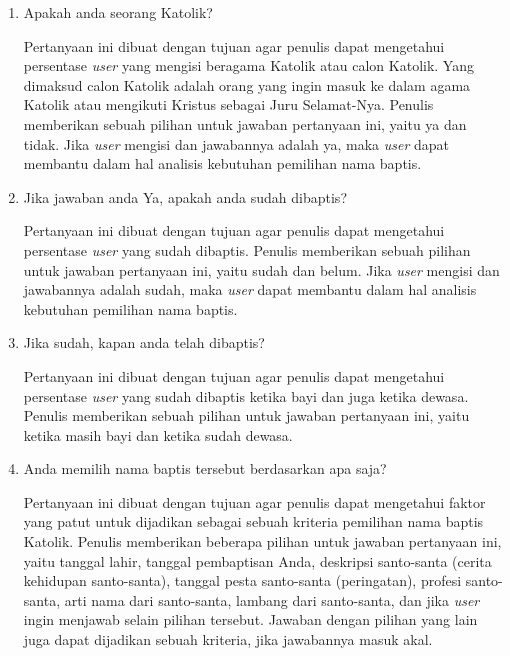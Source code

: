\begin{enumerate}
	\item Apakah anda seorang Katolik?
	
	Pertanyaan ini dibuat dengan tujuan agar penulis dapat mengetahui persentase \textit{user} yang mengisi beragama Katolik atau calon Katolik. Yang dimaksud calon Katolik adalah orang yang ingin masuk ke dalam agama Katolik atau mengikuti Kristus sebagai Juru Selamat-Nya. Penulis memberikan sebuah pilihan untuk jawaban pertanyaan ini, yaitu ya dan tidak. Jika \textit{user} mengisi dan jawabannya adalah ya, maka \textit{user} dapat membantu dalam hal analisis kebutuhan pemilihan nama baptis. %
	\item Jika jawaban anda Ya, apakah anda sudah dibaptis?
	
	Pertanyaan ini dibuat dengan tujuan agar penulis dapat mengetahui persentase \textit{user} yang sudah dibaptis. Penulis memberikan sebuah pilihan untuk jawaban pertanyaan ini, yaitu sudah dan belum. Jika \textit{user} mengisi dan jawabannya adalah sudah, maka \textit{user} dapat membantu dalam hal analisis kebutuhan pemilihan nama baptis. %
	\item Jika sudah, kapan anda telah dibaptis?
	
	Pertanyaan ini dibuat dengan tujuan agar penulis dapat mengetahui persentase \textit{user} yang sudah dibaptis ketika bayi dan juga ketika dewasa. Penulis memberikan sebuah pilihan untuk jawaban pertanyaan ini, yaitu ketika masih bayi dan ketika sudah dewasa.
	
	\item Anda memilih nama baptis tersebut berdasarkan apa saja?
	
	Pertanyaan ini dibuat dengan tujuan agar penulis dapat mengetahui faktor yang patut untuk dijadikan sebagai sebuah kriteria pemilihan nama baptis Katolik. Penulis memberikan beberapa pilihan untuk jawaban pertanyaan ini, yaitu tanggal lahir, tanggal pembaptisan Anda, deskripsi santo-santa (cerita kehidupan santo-santa), tanggal pesta santo-santa (peringatan), profesi santo-santa, arti nama dari santo-santa, lambang dari santo-santa, dan jika \textit{user} ingin menjawab selain pilihan tersebut. Jawaban dengan pilihan yang lain juga dapat dijadikan sebuah kriteria, jika jawabannya masuk akal.
\end{enumerate}


